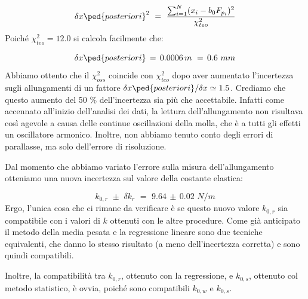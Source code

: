 \begin{equation*}
    \delta x\ped{posteriori}^2 \,\,=\,\, \frac{\sum_{i=1}^{N} (x_i - b_0 F_{p_i})^2}{\chi_{teo}^2}
\end{equation*}
%
Poiché $\chi_{teo}^2 = 12.0$ si calcola facilmente che:

\begin{equation*}
    \delta x\ped{posteriori} \,=\, 0.0006 \,m \,\,=\, 0.6 \,\, mm
\end{equation*}
%
Abbiamo ottento che il $\chi_{oss}^2$ coincide con $\chi_{teo}^2$ dopo aver aumentato l'incertezza sugli allungamenti di un fattore
$\delta x\ped{posteriori}/\delta x \simeq 1.5$.
Crediamo che questo aumento del 50 \% dell'incertezza sia più che accettabile.
Infatti come accennato all'inizio dell'analisi dei dati, la lettura
dell'allungamento non risultava così agevole a causa delle continue oscillazioni della molla, che è a tutti gli effetti
un oscillatore armonico. Inoltre, non abbiamo tenuto conto degli errori di parallasse, ma solo dell'errore di risoluzione. 

Dal momento che abbiamo variato l'errore sulla misura dell'allungamento otteniamo una nuova incertezza sul valore della
costante elastica:

\begin{equation*}
    k_{0,r} \,\, \pm \,\, \delta k_r \,\,=\,\, 9.64 \, \pm \, 0.02 \,\, N/m
\end{equation*}
%
Ergo, l'unica cosa che ci rimane da verificare è se questo nuovo valore $k_{0,r}$ sia compatibile con i
valori di $k$ ottenuti con le altre procedure. Come già anticipato il metodo della media pesata e la regressione lineare
sono due tecniche equivalenti, che danno lo stesso risultato (a meno dell'incertezza corretta) e sono quindi compatibili.

Inoltre, la compatibilità tra $k_{0,r}$, ottenuto con la regressione, e $k_{0,s}$, ottenuto col metodo statistico, è ovvia, poiché
sono compatibili $k_{0,w}$ e $k_{0,s}$.

%
